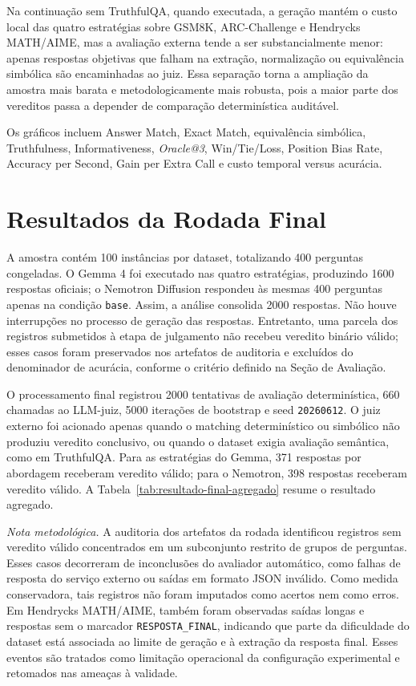 \documentclass[12pt]{article}
\makeatletter
\newcommand{\oracle}{\mbox{\textit{Oracle@3}}}
\makeatother
\begin{document}
Na continuação sem TruthfulQA, quando executada, a geração mantém o custo local das quatro estratégias sobre GSM8K, ARC-Challenge e Hendrycks MATH/AIME, mas a avaliação externa tende a ser substancialmente menor: apenas respostas objetivas que falham na extração, normalização ou equivalência simbólica são encaminhadas ao juiz. Essa separação torna a ampliação da amostra mais barata e metodologicamente mais robusta, pois a maior parte dos vereditos passa a depender de comparação determinística auditável.

Os gráficos incluem Answer Match, Exact Match, equivalência simbólica, Truthfulness, Informativeness, \oracle{}, Win/Tie/Loss, Position Bias Rate, Accuracy per Second, Gain per Extra Call e custo temporal versus acurácia.


\section{Resultados da Rodada Final}

A amostra contém 100 instâncias por dataset, totalizando 400 perguntas congeladas. O Gemma 4 foi executado nas quatro estratégias, produzindo 1600 respostas oficiais; o Nemotron Diffusion respondeu às mesmas 400 perguntas apenas na condição \texttt{base}. Assim, a análise consolida 2000 respostas. Não houve interrupções no processo de geração das respostas. Entretanto, uma parcela dos registros submetidos à etapa de julgamento não recebeu veredito binário válido; esses casos foram preservados nos artefatos de auditoria e excluídos do denominador de acurácia, conforme o critério definido na Seção de Avaliação.

O processamento final registrou 2000 tentativas de avaliação determinística, 660 chamadas ao LLM-juiz, 5000 iterações de bootstrap e seed \texttt{20260612}. O juiz externo foi acionado apenas quando o matching determinístico ou simbólico não produziu veredito conclusivo, ou quando o dataset exigia avaliação semântica, como em TruthfulQA. Para as estratégias do Gemma, 371 respostas por abordagem receberam veredito válido; para o Nemotron, 398 respostas receberam veredito válido. A Tabela~\ref{tab:resultado-final-agregado} resume o resultado agregado.

\noindent\textit{Nota metodológica.} A auditoria dos artefatos da rodada identificou registros sem veredito válido concentrados em um subconjunto restrito de grupos de perguntas. Esses casos decorreram de inconclusões do avaliador automático, como falhas de resposta do serviço externo ou saídas em formato JSON inválido. Como medida conservadora, tais registros não foram imputados como acertos nem como erros. Em Hendrycks MATH/AIME, também foram observadas saídas longas e respostas sem o marcador \texttt{RESPOSTA\_FINAL}, indicando que parte da dificuldade do dataset está associada ao limite de geração e à extração da resposta final. Esses eventos são tratados como limitação operacional da configuração experimental e retomados nas ameaças à validade.
\end{document}
